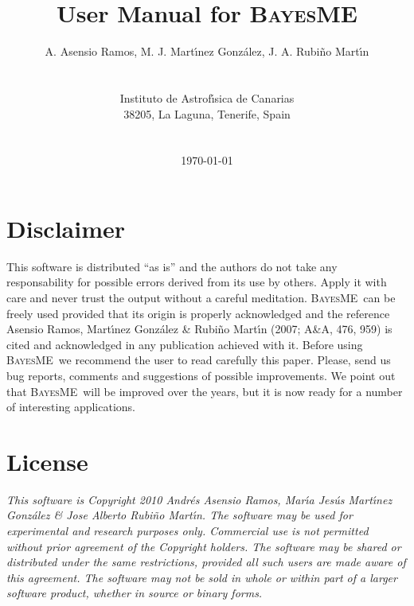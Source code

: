 \documentclass[12pt]{article}
\def\B{\textsc{BayesME}}
\begin{document}
\title                  {\sc User Manual for \B}

\author{ A. Asensio Ramos, M. J. Mart\'{\i}nez Gonz\'alez, J. A. Rubi\~no Mart\'{\i}n\\\\\\
         Instituto de Astrof\'{\i}sica de Canarias\\
         38205, La Laguna, Tenerife, Spain\\\\
        \\[0.5in] \today}
\date{}
\maketitle

\newpage

\tableofcontents

\newpage

\section*{Disclaimer}

This software is distributed ``as is'' and the authors do not take any responsability for
possible errors derived from its use by others. Apply it with care and
never trust the output without a careful meditation. \B\ can be freely used
provided that its origin is properly acknowledged and the reference Asensio Ramos, Mart\'{\i}nez
Gonz\'alez \& Rubi\~no Mart\'{\i}n (2007; A\&A, 476, 959) is cited and acknowledged in any
publication achieved with it. Before using \B\ we recommend the user to read carefully this
paper. Please, 
send us bug reports, comments and suggestions of possible improvements.
We point out that \B\ will be improved over the years, but it is now ready for a number of
interesting applications.

\section*{License}
\emph{This software is Copyright 2010 Andr\'es Asensio Ramos, Mar\'{\i}a Jes\'us
Mart\'{\i}nez Gonz\'alez \& Jose Alberto Rubi\~no Mart\'{\i}n. The software
may be used for experimental and research purposes only. Commercial use is
not permitted without prior agreement of the Copyright holders. The
software may be shared or distributed under the same restrictions, provided
all such users are made aware of this agreement. The software may not be
sold in whole or within part of a larger software product, whether in
source or binary forms.}
\end{document}
